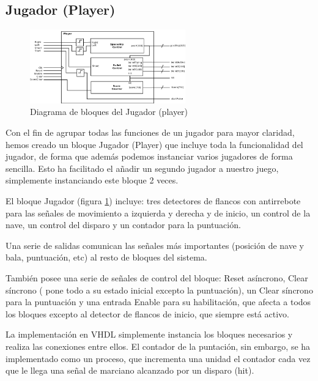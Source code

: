 \subsection{Jugador (Player)}
\label{player}

\begin{figure}[H]
	\centering
	\includegraphics[width=0.6\textwidth]{player_block.png}
	\caption{Diagrama de bloques del Jugador (player) }\label{fig:playerBlock}
\end{figure}

Con el fin de agrupar todas las funciones de un jugador para mayor claridad, hemos creado un bloque Jugador (Player) que incluye toda la funcionalidad del jugador, de forma que además podemos instanciar varios jugadores de forma sencilla. Esto ha facilitado el añadir un segundo jugador a nuestro juego, simplemente instanciando este bloque 2 veces.

El bloque Jugador (figura \ref{fig:playerBlock}) incluye: tres detectores de flancos con antirrebote para las señales de movimiento a izquierda y derecha y de inicio, un control de la nave, un control del disparo y un contador para la puntuación.

Una serie de salidas comunican las señales más importantes (posición de nave y bala, puntuación, etc) al resto de bloques del sistema.

También posee una serie de señales de control del bloque: Reset asíncrono, Clear síncrono ( pone todo a su estado inicial excepto la puntuación), un Clear síncrono para la puntuación y una entrada Enable para su habilitación, que afecta a todos los bloques excepto al detector de flancos de inicio, que siempre está activo.

La implementación en VHDL simplemente instancia los bloques necesarios y realiza las conexiones entre ellos. El contador de la puntación, sin embargo, se ha implementado como un proceso, que incrementa una unidad el contador cada vez que le llega una señal de marciano alcanzado por un disparo (hit).

